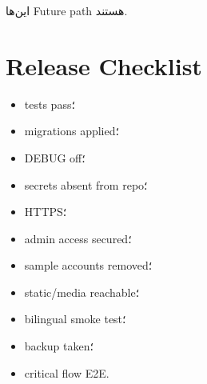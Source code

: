 این‌ها Future path هستند.

\section{Release Checklist}

\begin{itemize}
  \item tests pass؛
  \item migrations applied؛
  \item DEBUG off؛
  \item secrets absent from repo؛
  \item HTTPS؛
  \item admin access secured؛
  \item sample accounts removed؛
  \item static/media reachable؛
  \item bilingual smoke test؛
  \item backup taken؛
  \item critical flow E2E.
\end{itemize}
